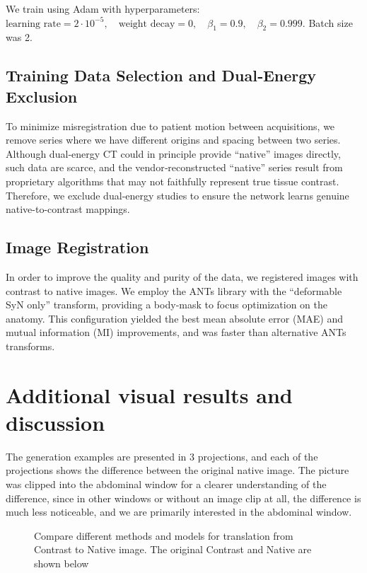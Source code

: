 \documentclass{article}
\begin{document}
We train using Adam with hyperparameters: $
  \text{learning rate}=2\cdot10^{-5},\quad
  \text{weight decay}=0,\quad
  \beta_1=0.9,\quad
  \beta_2=0.999.$ Batch size was 2.

\subsection{Training Data Selection and Dual‐Energy Exclusion}
To minimize misregistration due to patient motion between acquisitions, we remove series where we have different origins and spacing between two series. Although dual‐energy CT could in principle provide “native” images directly, such data are scarce, and the vendor‐reconstructed “native” series result from proprietary algorithms that may not faithfully represent true tissue contrast. Therefore, we exclude dual‐energy studies to ensure the network learns genuine native-to-contrast mappings.

\subsection{Image Registration}
In order to improve the quality and purity of the data, we registered images with contrast to native images. We employ the ANTs library with the “deformable SyN only” transform, providing a body‐mask to focus optimization on the anatomy. This configuration yielded the best mean absolute error (MAE) and mutual information (MI) improvements, and was faster than alternative ANTs transforms.


\section{Additional visual results and discussion}
The generation examples are presented in 3 projections, and each of the projections shows the difference between the original native image. The picture was clipped into the abdominal window for a clearer understanding of the difference, since in other windows or without an image clip at all, the difference is much less noticeable, and we are primarily interested in the abdominal window.
\begin{figure}[h!]
    \centering
    \caption{Compare different methods and models for translation from Contrast to Native image. The original Contrast and Native are shown below}
    \label{app:image_visual}
\end{figure}
\end{document}
